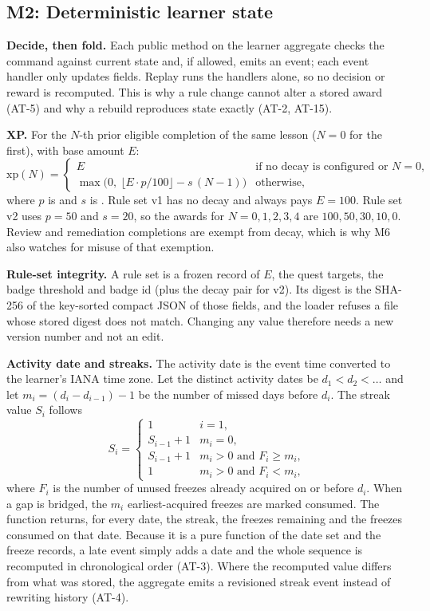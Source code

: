 \documentclass[11pt,a4paper]{article}
\renewcommand{\_}{\textunderscore\allowbreak{}}
\begin{document}
\subsection{M2: Deterministic learner state}

\textbf{Decide, then fold.} Each public method on the learner aggregate checks the command against current state and, if allowed, emits an event; each event handler only updates fields. Replay runs the handlers alone, so no decision or reward is recomputed. This is why a rule change cannot alter a stored award (AT-5) and why a rebuild reproduces state exactly (AT-2, AT-15).

\textbf{XP.} For the $N$-th prior eligible completion of the same lesson ($N=0$ for the first), with base amount $E$:
\[
\text{xp}(N)=
\begin{cases}
E & \text{if no decay is configured or } N=0,\\[2pt]
\max\!\Big(0,\ \big\lfloor E\cdot p/100\big\rfloor - s\,(N-1)\Big) & \text{otherwise,}
\end{cases}
\]
where $p$ is  and $s$ is . Rule set v1 has no decay and always pays $E=100$. Rule set v2 uses $p=50$ and $s=20$, so the awards for $N=0,1,2,3,4$ are $100, 50, 30, 10, 0$. Review and remediation completions are exempt from decay, which is why M6 also watches for misuse of that exemption.

\textbf{Rule-set integrity.} A rule set is a frozen record of $E$, the quest targets, the badge threshold and badge id (plus the decay pair for v2). Its digest is the SHA-256 of the key-sorted compact JSON of those fields, and the loader refuses a file whose stored digest does not match. Changing any value therefore needs a new version number and not an edit.

\textbf{Activity date and streaks.} The activity date is the event time converted to the learner's IANA time zone. Let the distinct activity dates be $d_1 < d_2 < \dots$ and let $m_i = (d_i - d_{i-1}) - 1$ be the number of missed days before $d_i$. The streak value $S_i$ follows
\[
S_i=
\begin{cases}
1 & i=1,\\
S_{i-1}+1 & m_i=0,\\
S_{i-1}+1 & m_i>0 \text{ and } F_i \ge m_i,\\
1 & m_i>0 \text{ and } F_i < m_i,
\end{cases}
\]
where $F_i$ is the number of unused freezes already acquired on or before $d_i$. When a gap is bridged, the $m_i$ earliest-acquired freezes are marked consumed. The function returns, for every date, the streak, the freezes remaining and the freezes consumed on that date. Because it is a pure function of the date set and the freeze records, a late event simply adds a date and the whole sequence is recomputed in chronological order (AT-3). Where the recomputed value differs from what was stored, the aggregate emits a revisioned streak event instead of rewriting history (AT-4).
\end{document}
